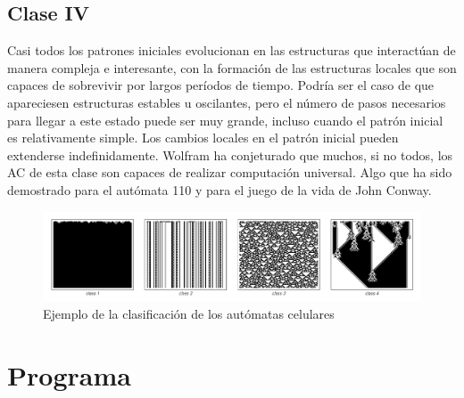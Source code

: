 \documentclass[11pt]{article}
\begin{document}
		\subsection{Clase IV}
		Casi todos los patrones iniciales evolucionan en las estructuras que interactúan de manera compleja e interesante, con la formación de las estructuras locales que son capaces de sobrevivir por largos períodos de tiempo. Podría ser el caso de que apareciesen estructuras estables u oscilantes, pero el número de pasos necesarios para llegar a este estado puede ser muy grande, incluso cuando el patrón inicial es relativamente simple. Los cambios locales en el patrón inicial pueden extenderse indefinidamente. Wolfram ha conjeturado que muchos, si no todos, los AC de esta clase son capaces de realizar computación universal. Algo que ha sido demostrado para el autómata 110 y para el juego de la vida de John Conway.
		
		\begin{figure}[H]
			\includegraphics[scale=0.355]{resources/clasificacion_AC.png}
			\caption{Ejemplo de la clasificación de los autómatas celulares}\label{fig:picture}
		\end{figure}
	
	\newpage
		
	\section{Programa}	
\end{document}
